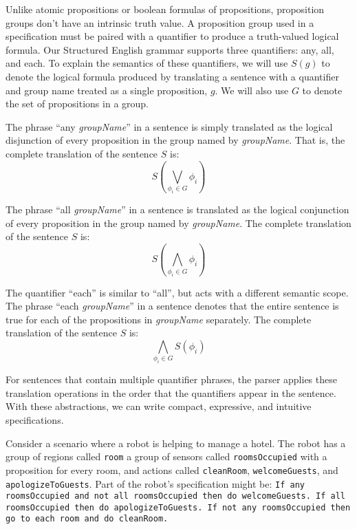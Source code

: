 Unlike atomic propositions or boolean formulas of propositions, proposition groups don't have an intrinsic truth value. 
A proposition group used in a specification must be paired with a quantifier to produce a truth-valued logical formula. 
Our Structured English grammar supports three quantifiers: any, all, and each. 
To explain the semantics of these quantifiers, we will use $S(g)$ to denote the logical formula produced by translating a sentence with a quantifier and group name treated as a single proposition, $g$. 
We will also use $G$ to denote the set of propositions in a group. 
\par
The phrase ``any \textit{groupName}'' in a sentence is simply translated as the logical disjunction of every proposition in the group named by \textit{groupName}. 
That is, the complete translation of the sentence $S$ is: 
\begin{equation*}
	S( \bigvee \limits_{\phi_i \in G} \phi_i )
\end{equation*}
\par
The phrase ``all \textit{groupName}'' in a sentence is translated as the logical conjunction of every proposition in the group named by \textit{groupName}. 
The complete translation of the sentence $S$ is: 
\begin{equation*}
	S( \bigwedge \limits_{\phi_i \in G} \phi_i )
\end{equation*}
\par
The quantifier ``each'' is similar to ``all'', but acts with a different semantic scope. 
The phrase ``each \textit{groupName}'' in a sentence denotes that the entire sentence is true for each of the propositions in \textit{groupName} separately. 
The complete translation of the sentence $S$ is:
\begin{equation*}
 	\bigwedge\limits_{\phi_i \in G} S(\phi_i)
\end{equation*}
\par
For sentences that contain multiple quantifier phrases, the parser applies these translation operations in the order that the quantifiers appear in the sentence. 
With these abstractions, we can write compact, expressive, and intuitive specifications. 
\par
\begin{myExample}\label{Ex:quantifiers} 	
	Consider a scenario where a robot is helping to manage a hotel. 
	The robot has a group of regions called \texttt{room} a group of sensors called \texttt{roomsOccupied} with a proposition for every room, and actions called \texttt{cleanRoom}, \texttt{welcomeGuests}, and \texttt{apologizeToGuests}. 
	Part of the robot's specification might be: 
	\texttt{If any roomsOccupied and not all roomsOccupied then do welcomeGuests. 
	If all roomsOccupied then do apologizeToGuests. 
	If not any roomsOccupied then go to each room and do cleanRoom. } 
\end{myExample}

